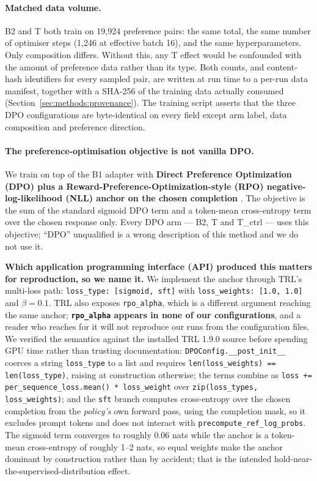 \paragraph{Matched data volume.} B2 and T both train on 19{,}924 preference pairs: the
same total, the same number of optimiser steps (1{,}246 at effective batch 16), and the
same hyperparameters. Only composition differs. Without this, any T effect would be
confounded with the amount of preference data rather than its type. Both counts, and
content-hash identifiers for every sampled pair, are written at run time to a per-run
data manifest, together with a SHA-256 of the training data actually consumed
(Section~\ref{sec:methods:provenance}). The training script asserts that the three DPO
configurations are byte-identical on every field except arm label, data composition and
preference direction.

\paragraph{The preference-optimisation objective is not vanilla DPO.} We train on top of
the B1 adapter with \textbf{Direct Preference Optimization (DPO) \citep{rafailov2023dpo}
plus a Reward-Preference-Optimization-style (RPO) negative-log-likelihood (NLL) anchor on
the chosen completion} \citep{pang2024irpo}. The objective is the sum of the standard
sigmoid DPO term and a token-mean cross-entropy term over the chosen response only. Every
DPO arm --- B2, T and T\_ctrl --- uses this objective; ``DPO'' unqualified is a wrong
description of this method and we do not use it.

\textbf{Which application programming interface (API) produced this matters for
reproduction, so we name it.} We implement the anchor through TRL's multi-loss path:
\texttt{loss\_type: [sigmoid, sft]} with \texttt{loss\_weights: [1.0, 1.0]} and
$\beta = 0.1$. TRL also exposes \texttt{rpo\_alpha}, which is a different argument
reaching the same anchor; \textbf{\texttt{rpo\_alpha} appears in none of our
configurations}, and a reader who reaches for it will not reproduce our runs from the
configuration files. We verified the semantics against the installed TRL 1.9.0 source
before spending GPU time rather than trusting documentation: \texttt{DPOConfig.\_\_post\_init\_\_}
coerces a string \texttt{loss\_type} to a list and requires
\texttt{len(loss\_weights) == len(loss\_type)}, raising at construction otherwise; the
terms combine as \texttt{loss += per\_sequence\_loss.mean() * loss\_weight} over
\texttt{zip(loss\_types, loss\_weights)}; and the \texttt{sft} branch computes
cross-entropy over the chosen completion from the \emph{policy's} own forward pass, using
the completion mask, so it excludes prompt tokens and does not interact with
\texttt{precompute\_ref\_log\_probs}. The sigmoid term converges to roughly 0.06 nats
while the anchor is a token-mean cross-entropy of roughly 1--2 nats, so equal weights make
the anchor dominant by construction rather than by accident; that is the intended
hold-near-the-supervised-distribution effect.

